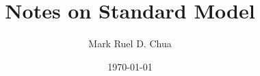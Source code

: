 \documentclass[b5paper,12pt]{book}
\begin{document}
\author{Mark Ruel D. Chua}
\title{Notes on Standard Model}
\date{\today}

\frontmatter
\maketitle

\tableofcontents

\mainmatter





\backmatter
\end{document}
